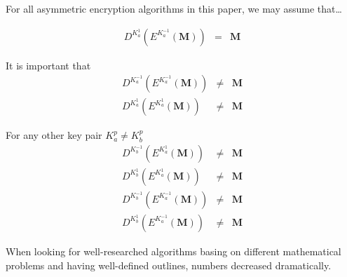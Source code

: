 For all asymmetric encryption algorithms in this paper, we may assume that\ldots

\begin{eqnarray}
	D^{K^{1}_a}\left(E^{K^{-1}_a}\left(\mathbf{M}\right)\right) & = & \mathbf{M}
\end{eqnarray} 

It is important that 
\begin{eqnarray}
	D^{K^{-1}_a}\left(E^{K^{-1}_a}\left(\mathbf{M}\right)\right) & \neq & \mathbf{M}\\
	D^{K^{1}_a}\left(E^{K^{1}_a}\left(\mathbf{M}\right)\right)   & \neq & \mathbf{M}
\end{eqnarray} 

For any other key pair $K^{p}_a \neq K^{p}_b$
\begin{eqnarray}
	D^{K^{-1}_b}\left(E^{K^{1}_a}\left(\mathbf{M}\right)\right)  & \neq & \mathbf{M}\\
	D^{K^{1}_b}\left(E^{K^{1}_a}\left(\mathbf{M}\right)\right)   & \neq & \mathbf{M}\\
	D^{K^{-1}_b}\left(E^{K^{-1}_a}\left(\mathbf{M}\right)\right) & \neq & \mathbf{M}\\
	D^{K^{1}_b}\left(E^{K^{-1}_a}\left(\mathbf{M}\right)\right)  & \neq & \mathbf{M}
\end{eqnarray} 

When looking for well-researched algorithms basing on different mathematical problems and having well-defined outlines, numbers decreased dramatically.

